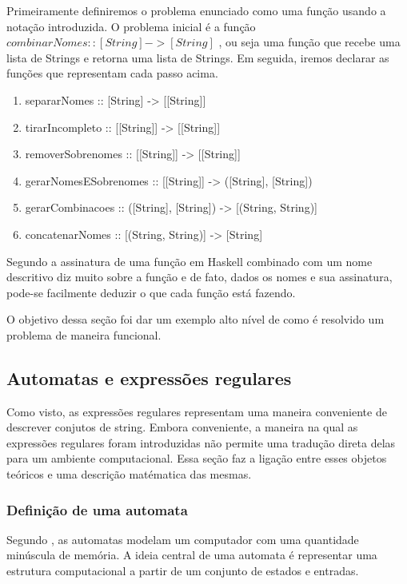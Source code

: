 Primeiramente definiremos o problema enunciado como uma função usando a notação introduzida.
O problema inicial é a função $combinarNomes :: [String] -> [String]$ , ou seja uma função que recebe uma lista de Strings e retorna uma lista de Strings.
Em seguida, iremos declarar as funções que representam cada passo acima.

\begin{enumerate}
\item{separarNomes :: [String] -> [[String]]}
\item{tirarIncompleto :: [[String]] -> [[String]]}
\item{removerSobrenomes :: [[String]] -> [[String]]}
\item{gerarNomesESobrenomes :: [[String]] -> ([String], [String])}
\item{gerarCombinacoes :: ([String], [String]) -> [(String, String)]}
\item{concatenarNomes :: [(String, String)] -> [String]}
\end{enumerate}

Segundo \cite{lipovaca} a assinatura de uma função em Haskell combinado com um nome descritivo diz muito sobre a função e de fato, dados os nomes e sua assinatura, pode-se facilmente deduzir o que cada função está fazendo.

O objetivo dessa seção foi dar um exemplo alto nível de como é resolvido um problema de maneira funcional.

\subsection{Automatas e expressões regulares}

Como visto, as expressões regulares representam uma maneira conveniente de descrever conjutos de string.
Embora conveniente, a maneira na qual as expressões regulares foram introduzidas não permite uma tradução direta delas para um ambiente computacional.
Essa seção faz a ligação entre esses objetos teóricos e uma descrição matématica das mesmas.

\subsubsection{Definição de uma automata}

Segundo \cite{comp}, as automatas modelam um computador com uma quantidade minúscula de memória.
A ideia central de uma automata é representar uma estrutura computacional a partir de um conjunto de estados e entradas.

